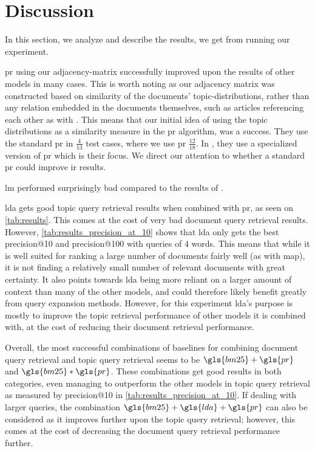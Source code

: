 \section{Discussion}\label{sec:discussion}
In this section, we analyze and describe the results, we get from running our experiment.

\gls{pr} using our adjacency-matrix successfully improved upon the results of other models in many cases.
This is worth noting as our adjacency matrix was constructed based on similarity of the documents' topic-distributions, rather than any relation embedded in the documents themselves, such as articles referencing each other as with \cite{yang2009topic}.
This means that our initial idea of using the topic distributions as a similarity measure in the \gls{pr} algorithm, was a success.
They use the standard \gls{pr} in $\frac{4}{13}$ test cases, where we use \gls{pr} $\frac{12}{18}$.
In \cite{yang2009topic}, they use a specialized version of \gls{pr} which is their focus.
We direct our attention to whether a standard \gls{pr} could improve \gls{ir} results.

\gls{lm} performed surprisingly bad compared to the results of \cite{yang2009topic}. 

\gls{lda} gets good topic query retrieval results when combined with \gls{pr}, as seen on \autoref{tab:results}.
This comes at the cost of very bad document query retrieval results.
However, \autoref{tab:results_precision_at_10} shows that \gls{lda} only gets the best precision@10 and precision@100 with queries of 4 words.
This means that while it is well suited for ranking a large number of documents fairly well (as with \gls{map}), it is not finding a relatively small number of relevant documents with great certainty.
It also points towards \gls{lda} being more reliant on a larger amount of context than many of the other models, and could therefore likely benefit greatly from query expansion methods.
However, for this experiment \gls{lda}'s purpose is mostly to improve the topic retrieval performance of other models it is combined with, at the cost of reducing their document retrieval performance.

Overall, the most successful combinations of baselines for combining document query retrieval and topic query retrieval seems to be $\gls{bm25}+\gls{pr}$ and $\gls{bm25}*\gls{pr}$.
These combinations get good results in both categories, even managing to outperform the other models in topic query retrieval as measured by precision@10 in \autoref{tab:results_precision_at_10}.
If dealing with larger queries, the combination $\gls{bm25}+\gls{lda}+\gls{pr}$ can also be considered as it improves further upon the topic query retrieval; however, this comes at the cost of decreasing the document query retrieval performance further.